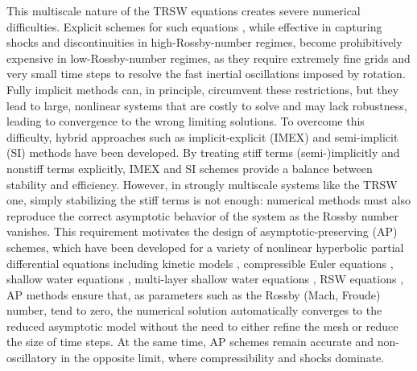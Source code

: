 \documentclass[a4paper,11pt,twoside]{article}
\numberwithin{equation}{section}
\numberwithin{figure}{section}
\numberwithin{table}{section}
\begin{document}
This multiscale nature of the TRSW equations creates severe numerical difficulties. Explicit schemes  for such equations
\cite{Eldred_2019,Kurganov_2020,Kurganov_2021,Ricardo_2024,Tambyah_2025}, while effective in capturing shocks and discontinuities in
high-Rossby-number regimes, become prohibitively expensive in low-Rossby-number regimes, as they require extremely fine grids and very small
time steps to resolve the fast inertial oscillations imposed by rotation. Fully implicit methods can, in principle, circumvent these
restrictions, but they lead to large, nonlinear systems that are costly to solve and may lack robustness, leading to convergence to the
wrong limiting solutions. To overcome this difficulty, hybrid approaches such as implicit-explicit (IMEX)
\cite{Ascher_1997,Boscarino_2013,Boscarino_2018,Hu_2025,Kennedy_2003} and semi-implicit (SI)
\cite{Boscarino_2016,Boscarino_2022,Chertock_2015} methods have been developed. By treating stiff terms (semi-)implicitly and nonstiff terms
explicitly, IMEX and SI schemes provide a balance between stability and efficiency. However, in strongly multiscale systems like the TRSW
one, simply stabilizing the stiff terms is not enough: numerical methods must also reproduce the correct asymptotic behavior of the system
as the Rossby number vanishes. This requirement motivates the design of asymptotic-preserving (AP) schemes, which have been developed for a
variety of nonlinear hyperbolic partial differential equations including kinetic models 
\cite{Jin_1999,Filbet_2010,Dimarco_2013,Hu_2017,Abgrall_2020,Klar_1999,Zhang_2023,Anandan_2024}, compressible Euler equations 
\cite{Allegrini_2025,Boscarino_2019,Boscarino_2022,Boscheri_2020,CKKM, Degond_2007,Dimarco_2017,Haack_2012,Huang_2025,Klein_1995,Zeifang_2020},
shallow water equations \cite{Bispen_2014,Busto_2022,Huang_2022,Huang_2024,Liu_2020,Vater_2018,Xie_2024}, multi-layer shallow water
equations \cite{Couderc_2017,Duran_2017}, RSW equations \cite{Kurganov_2022,Liu_2019,Xie_2025,Zakerzadeh_2017,Zhang_2026}, AP methods
ensure that, as parameters such as the Rossby (Mach, Froude) number, tend to zero, the numerical solution automatically converges to the
reduced asymptotic model without the need to either refine the mesh or reduce the size of time steps. At the same time, AP schemes remain
accurate and non-oscillatory in the opposite limit, where compressibility and shocks dominate.
\end{document}
